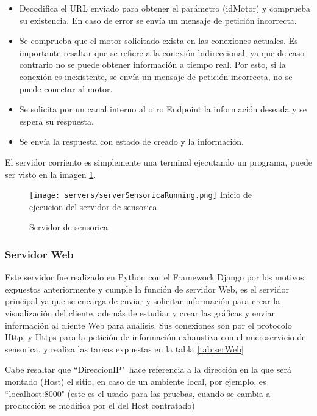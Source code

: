     \begin{itemize}
        \item Decodifica el URL enviado para obtener el parámetro (idMotor) y
            comprueba su existencia. En caso de error se envía un mensaje
            de petición incorrecta.
        \item Se comprueba que el motor solicitado exista en las conexiones
            actuales. Es importante resaltar que se refiere a la conexión
            bidireccional, ya que de caso contrario no se puede obtener información
            a tiempo real. Por esto, si la conexión es inexistente, se envía un
            mensaje de petición incorrecta, no se puede conectar al motor.
        \item Se solicita por un canal interno al otro Endpoint la información
            deseada y se espera su respuesta.
        \item Se envía la respuesta con estado de creado y la información.
    \end{itemize}

    El servidor corriento es simplemente una terminal ejecutando un programa,
    puede ser visto en la imagen \ref{img:serverSensoricaRunning}.

	\begin{figure}[htb]
		\centering
        \caption{Servidor de sensorica}
        \texttt{[image: servers/serverSensoricaRunning.png]}
        Inicio de ejecucion del servidor de sensorica.    \label{img:serverSensoricaRunning}
	\end{figure}

    \subsubsection{Servidor Web}
    Este servidor fue realizado en Python con el Framework Django
    por los motivos expuestos anteriormente y cumple la función de servidor Web,
    es el servidor principal ya que se encarga de enviar y solicitar información
    para crear la visualización del cliente, además de estudiar y crear las gráficas
    y enviar información al cliente Web para análisis.
    Sus conexiones son por el protocolo Http, y Https para la petición de información
    exhaustiva con el microservicio de sensorica. y realiza las tareas expuestas
    en la tabla \ref{tab:serWeb}

    Cabe resaltar que ``DireccionIP"\ hace referencia a la dirección en la
    que será montado (Host) el sitio, en caso de un ambiente local, por
    ejemplo, es ``localhost:8000" (este es el usado para las pruebas,
    cuando se cambia a producción se modifica por el del Host contratado)

